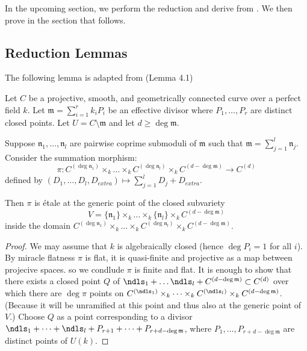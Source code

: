 In the upcoming section, we perform the reduction and derive  from 
. 
We then prove  in the section that follows.

\subsection{Reduction Lemmas}

The following lemma is adapted from \cite{takeuchi2018blow} (Lemma 4.1)
\begin{lemma}\label{lemma:takeuchi_lemma}
     Let $C$ be a projective, smooth, and geometrically connected curve over a perfect field $k$. 
     Let $\mathfrak{m} = \sum_{i=1}^{r} k_i P_i$ be an effective divisor where $P_1, \dots, P_r$ are distinct closed points. 
     Let $U = C \setminus \mathfrak{m}$ and let $d \geq \deg \mathfrak{m}$.

     Suppose $\mathfrak{n}_1, \dots, \mathfrak{n}_l$ are pairwise coprime submoduli of $\mathfrak{m}$ such that $\mathfrak{m} = \sum_{j=1}^l \mathfrak{n}_j$. 
     Consider the summation morphism:
     \[
     \pi : C^{(\deg \mathfrak{n}_1)} \times_k \dots \times_k C^{(\deg \mathfrak{n}_l)} \times_k C^{(d - \deg \mathfrak{m})} \longrightarrow C^{(d)}
     \]
     defined by $(D_1, \dots, D_l, D_{extra}) \mapsto \sum_{j=1}^l D_j + D_{extra}$.

     Then $\pi$ is étale at the generic point of the closed subvariety 
     \[
     V = \{\mathfrak{n}_1\} \times_k \dots \times_k \{\mathfrak{n}_l\} \times_k C^{(d - \deg \mathfrak{m})}
     \]
     inside the domain $C^{(\deg \mathfrak{n}_1)} \times_k \dots \times_k C^{(\deg \mathfrak{n}_l)} \times_k C^{(d - \deg \mathfrak{m})}$.

\begin{proof}
     We may assume that $k$ is algebraically closed (hence $\deg P_i = 1$ for all $i$). By miracle flatness $\pi$ is flat, it is quasi-finite and projective as a map between projecive spaces.
     so we condlude $\pi$ is finite and flat. 
     It is enough to show that there exists a closed point $Q$ of $\ndls_1 + \dots \ndls_l + C^{(d - \deg \mathfrak{m})} \subset C^{(d)}$ 
     over which there are $\deg \pi$ points on $C^{(\ndls_1)} \times_k \dots \times_k C^{(\ndls_l)} \times_k C^{(d - \deg \mathfrak{m})}$. (Because it will be unramified 
     at this point and thus also at the generic point of $V$.)
     Choose $Q$ as a point corresponding to a divisor
     $\ndls_1 + \dots + \ndls_l + P_{r+1} + \dots + P_{r+d - \deg \mathfrak{m}}$, where $P_1, \dots, P_{r+d - \deg \mathfrak{m}}$ are distinct points of $U(k)$.
\end{proof}     
\end{lemma}

